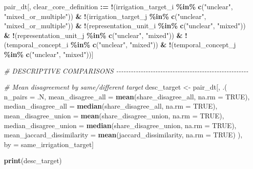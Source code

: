 \documentclass[
  11pt,
]{article}
\newenvironment{Shaded}{\begin{snugshade}}{\end{snugshade}}
\newcommand{\AttributeTok}[1]{\textcolor[rgb]{0.13,0.29,0.53}{#1}}
\newcommand{\CommentTok}[1]{\textcolor[rgb]{0.56,0.35,0.01}{\textit{#1}}}
\newcommand{\ConstantTok}[1]{\textcolor[rgb]{0.56,0.35,0.01}{#1}}
\newcommand{\FunctionTok}[1]{\textcolor[rgb]{0.13,0.29,0.53}{\textbf{#1}}}
\newcommand{\NormalTok}[1]{#1}
\newcommand{\OtherTok}[1]{\textcolor[rgb]{0.56,0.35,0.01}{#1}}
\newcommand{\SpecialCharTok}[1]{\textcolor[rgb]{0.81,0.36,0.00}{\textbf{#1}}}
\newcommand{\StringTok}[1]{\textcolor[rgb]{0.31,0.60,0.02}{#1}}
\begin{document}
\begin{Shaded}
\begin{Highlighting}[]
\NormalTok{pair\_dt[, clear\_core\_definition }\SpecialCharTok{:=}
          \SpecialCharTok{!}\NormalTok{(irrigation\_target\_i }\SpecialCharTok{\%in\%} \FunctionTok{c}\NormalTok{(}\StringTok{"unclear"}\NormalTok{, }\StringTok{"mixed\_or\_multiple"}\NormalTok{)) }\SpecialCharTok{\&}
          \SpecialCharTok{!}\NormalTok{(irrigation\_target\_j }\SpecialCharTok{\%in\%} \FunctionTok{c}\NormalTok{(}\StringTok{"unclear"}\NormalTok{, }\StringTok{"mixed\_or\_multiple"}\NormalTok{)) }\SpecialCharTok{\&}
          \SpecialCharTok{!}\NormalTok{(representation\_unit\_i }\SpecialCharTok{\%in\%} \FunctionTok{c}\NormalTok{(}\StringTok{"unclear"}\NormalTok{, }\StringTok{"mixed"}\NormalTok{)) }\SpecialCharTok{\&}
          \SpecialCharTok{!}\NormalTok{(representation\_unit\_j }\SpecialCharTok{\%in\%} \FunctionTok{c}\NormalTok{(}\StringTok{"unclear"}\NormalTok{, }\StringTok{"mixed"}\NormalTok{)) }\SpecialCharTok{\&}
          \SpecialCharTok{!}\NormalTok{(temporal\_concept\_i }\SpecialCharTok{\%in\%} \FunctionTok{c}\NormalTok{(}\StringTok{"unclear"}\NormalTok{, }\StringTok{"mixed"}\NormalTok{)) }\SpecialCharTok{\&}
          \SpecialCharTok{!}\NormalTok{(temporal\_concept\_j }\SpecialCharTok{\%in\%} \FunctionTok{c}\NormalTok{(}\StringTok{"unclear"}\NormalTok{, }\StringTok{"mixed"}\NormalTok{))]}


\CommentTok{\# DESCRIPTIVE COMPARISONS {-}{-}{-}{-}{-}{-}{-}{-}{-}{-}{-}{-}{-}{-}{-}{-}{-}{-}{-}{-}{-}{-}{-}{-}{-}{-}{-}{-}{-}{-}{-}{-}{-}{-}{-}{-}{-}{-}{-}{-}{-}{-}{-}{-}{-}{-}{-}{-}{-}{-}{-}{-}{-}{-}}

\CommentTok{\# Mean disagreement by same/different target}
\NormalTok{desc\_target }\OtherTok{\textless{}{-}}\NormalTok{ pair\_dt[, .(}
  \AttributeTok{n\_pairs =}\NormalTok{ .N,}
  \AttributeTok{mean\_disagree\_all =} \FunctionTok{mean}\NormalTok{(share\_disagree\_all, }\AttributeTok{na.rm =} \ConstantTok{TRUE}\NormalTok{),}
  \AttributeTok{median\_disagree\_all =} \FunctionTok{median}\NormalTok{(share\_disagree\_all, }\AttributeTok{na.rm =} \ConstantTok{TRUE}\NormalTok{),}
  \AttributeTok{mean\_disagree\_union =} \FunctionTok{mean}\NormalTok{(share\_disagree\_union, }\AttributeTok{na.rm =} \ConstantTok{TRUE}\NormalTok{),}
  \AttributeTok{median\_disagree\_union =} \FunctionTok{median}\NormalTok{(share\_disagree\_union, }\AttributeTok{na.rm =} \ConstantTok{TRUE}\NormalTok{),}
  \AttributeTok{mean\_jaccard\_dissimilarity =} \FunctionTok{mean}\NormalTok{(jaccard\_dissimilarity, }\AttributeTok{na.rm =} \ConstantTok{TRUE}\NormalTok{)}
\NormalTok{), by }\OtherTok{=}\NormalTok{ same\_irrigation\_target]}

\FunctionTok{print}\NormalTok{(desc\_target)}
\end{Highlighting}
\end{Shaded}
\end{document}
